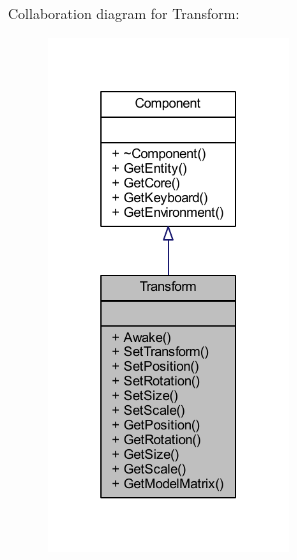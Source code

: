 Collaboration diagram for Transform\+:
\nopagebreak
\begin{figure}[H]
\begin{center}
\leavevmode
\includegraphics[width=181pt]{class_transform__coll__graph}
\end{center}
\end{figure}
